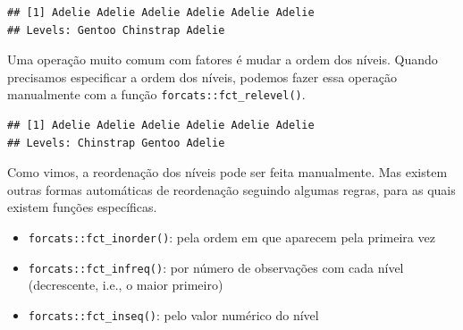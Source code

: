 \documentclass[
]{article}
\newenvironment{Shaded}{\begin{snugshade}}{\end{snugshade}}
\newcommand{\DocumentationTok}[1]{\textcolor[rgb]{0.56,0.35,0.01}{\textbf{\textit{#1}}}}
\newcommand{\FunctionTok}[1]{\textcolor[rgb]{0.13,0.29,0.53}{\textbf{#1}}}
\newcommand{\NormalTok}[1]{#1}
\newcommand{\SpecialCharTok}[1]{\textcolor[rgb]{0.81,0.36,0.00}{\textbf{#1}}}
\newcommand{\StringTok}[1]{\textcolor[rgb]{0.31,0.60,0.02}{#1}}
\providecommand{\tightlist}{%
  \setlength{\itemsep}{0pt}\setlength{\parskip}{0pt}}
\begin{document}
\begin{verbatim}
## [1] Adelie Adelie Adelie Adelie Adelie Adelie
## Levels: Gentoo Chinstrap Adelie
\end{verbatim}

Uma operação muito comum com fatores é mudar a ordem dos níveis. Quando precisamos especificar a ordem dos níveis, podemos fazer essa operação manualmente com a função \texttt{forcats::fct\_relevel()}.

\begin{Shaded}
\end{Shaded}

\begin{verbatim}
## [1] Adelie Adelie Adelie Adelie Adelie Adelie
## Levels: Chinstrap Gentoo Adelie
\end{verbatim}

Como vimos, a reordenação dos níveis pode ser feita manualmente. Mas existem outras formas automáticas de reordenação seguindo algumas regras, para as quais existem funções específicas.

\begin{itemize}
\tightlist
\item
  \texttt{forcats::fct\_inorder()}: pela ordem em que aparecem pela primeira vez
\item
  \texttt{forcats::fct\_infreq()}: por número de observações com cada nível (decrescente, i.e., o maior primeiro)
\item
  \texttt{forcats::fct\_inseq()}: pelo valor numérico do nível
\end{itemize}

\begin{Shaded}
\end{Shaded}
\end{document}
